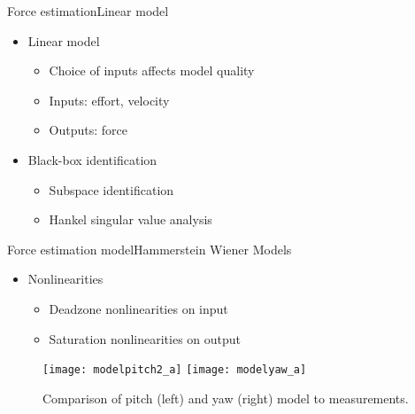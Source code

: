 
\begin{frame}{Force estimation}{Linear model}
\begin{itemize}
\item Linear model
  \begin{itemize}
  \item Choice of inputs affects model quality
  \item Inputs: effort, velocity 
  \item Outputs: force
  \end{itemize}
\item Black-box identification
	\begin{itemize}
	\item Subspace identification
	\item Hankel singular value analysis
	\end{itemize}
\end{itemize}

\end{frame}


\begin{frame}{Force estimation model}{Hammerstein Wiener Models}
\begin{itemize}
  \item Nonlinearities
  \begin{itemize}
    \item Deadzone nonlinearities on input 
    \item Saturation nonlinearities on output
  \end{itemize}
\end{itemize}


 \begin{figure}[h]
 \centering
 \texttt{[image: modelpitch2\_a]}
 \texttt{[image: modelyaw\_a]}
 \caption{Comparison of pitch (left) and yaw (right) model to measurements.}
 \label{fig:final_res_yaw}
 \end{figure}
\end{frame}
